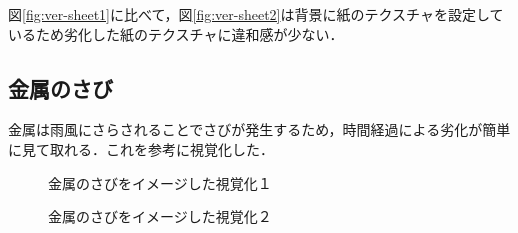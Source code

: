 図\ref{fig:ver-sheet1}に比べて，図\ref{fig:ver-sheet2}は背景に紙のテクスチャを設定しているため劣化した紙のテクスチャに違和感が少ない．

\subsection{金属のさび}
\label{subsec:ver-tex-russet}

金属は雨風にさらされることでさびが発生するため，時間経過による劣化が簡単に見て取れる．これを参考に視覚化した．

\begin{figure}[htbp]
  \begin{minipage}{0.5\hsize}
    \begin{center}
    \end{center}
    \caption{金属のさびをイメージした視覚化１}
    \label{fig:ver-russet1}
  \end{minipage}
  \begin{minipage}{0.5\hsize}
    \begin{center}
    \end{center}
    \caption{金属のさびをイメージした視覚化２}
    \label{fig:ver-russet2}
  \end{minipage}
\end{figure}

